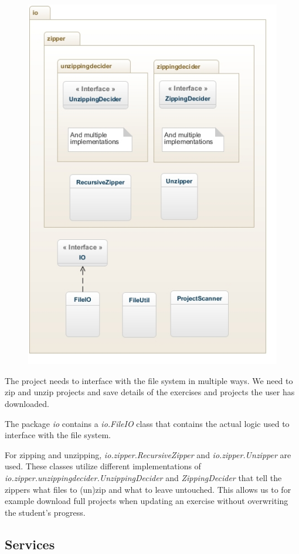 \documentclass[12pt,a4paper,english,leqno]{article}
\begin{document}
\begin{figure}[ht!]
\centering
\includegraphics[scale=1]{img/io.jpg}
\end{figure}

The project needs to interface with the file system in multiple ways. We need to zip and unzip projects and save details of the exercises and projects the user has downloaded.

The package \textit{io} contains a \textit{io.FileIO} class that contains the actual logic used to interface with the file system.

For zipping and unzipping, \textit{io.zipper.RecursiveZipper} and \textit{io.zipper.Unzipper} are used. These classes utilize different implementations of \textit{io.zipper.unzippingdecider.UnzippingDecider} and \textit{ZippingDecider} that tell the zippers what files to (un)zip and what to leave untouched. This allows us to for example download full projects when updating an exercise without overwriting the student's progress.

\subsection{Services}
\end{document}
